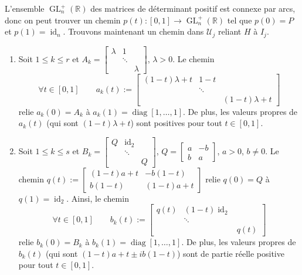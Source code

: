 \documentclass[french]{article}
\theoremstyle{definition}
\newcommand{\Rbb}{\mathbb{R}}
\newcommand{\Ucal}{\mathcal{U}}
\newcommand{\id}{\operatorname{id}}
\newcommand{\GL}{\operatorname{GL}}
\newcommand{\diag}{\operatorname{diag}}
\begin{document}
\begin{enumerate}
        L'ensemble $\GL^+_n(\Rbb)$ des matrices de d\'eterminant positif est connexe par arcs, donc on peut trouver un chemin $p(t): [0,1] \to \GL^{+}_n(\Rbb)$ tel que $p(0) = P$ et $p(1) = \id_n$. Trouvons maintenant un chemin dans $\Ucal_j$ reliant $H$ \`a $I_j$.
        \begin{enumerate}
            \item Soit $1 \le k \le r$ et $A_k = \begin{bmatrix}
                \lambda &  1  \\
                &  \ddots \\
                & & \lambda
            \end{bmatrix}$, $\lambda > 0$. Le chemin
                $$\forall t \in [0,1] \qquad a_k(t):=  \begin{bmatrix}
                (1-t)\lambda + t & 1 - t  \\
                &  \ddots \\
                & & (1-t)\lambda + t
            \end{bmatrix}$$
        relie $a_k(0) = A_k$ \`a $a_k(1) = \diag[1,\ldots,1]$. De plus, les valeurs propres de $a_k(t)$ (qui sont $(1 - t)\lambda + t$) sont positives pour tout $t \in [0,1]$.
        
            \item Soit $1 \le k \le s$ et $B_k = \begin{bmatrix}
                Q &  \id_2  \\
                &  \ddots \\
                & & Q
            \end{bmatrix}$, $Q = \begin{bmatrix} a & -b \\
            b & a \end{bmatrix}$, $a > 0$, $b \neq 0$. Le chemin $q(t):=\begin{bmatrix}
                (1-t)a + t & -b(1-t)\\
                b(1-t) & (1-t)a + t
            \end{bmatrix}$ relie $q(0) = Q$ \`a $q(1) = \id_2$. Ainsi, le chemin
                $$\forall t \in [0,1] \qquad b_k(t):=              \begin{bmatrix}
                         q(t) & (1 - t)\id_2  \\
                         &  \ddots \\
                         & & q(t)
                    \end{bmatrix}$$
        relie $b_k(0) = B_k$ \`a $b_k(1) = \diag[1,\ldots,1]$. De plus, les valeurs propres de $b_k(t)$ (qui sont $(1 - t)a + t \pm ib(1-t)$) sont de partie r\'eelle positive pour tout $t \in [0,1]$.
        

\end{enumerate}
\end{enumerate}
\end{document}
